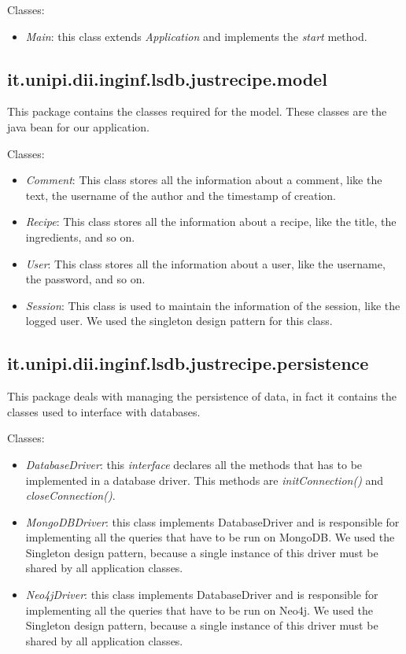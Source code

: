 \documentclass[a4paper]{report}
\begin{document}
\noindent Classes:
 \begin{itemize}
	\item \emph{Main}: this class extends \emph{Application} and implements the \emph{start} method. 
\end{itemize}
\subsection{it.unipi.dii.inginf.lsdb.justrecipe.model}
This package contains the classes required for the model. These classes are the java bean for our application.

\noindent Classes:
  \begin{itemize}
	\item \emph{Comment}: This class stores all the information about a comment, like the text, the username of the author and the timestamp of creation. 
	\item \emph{Recipe}: This class stores all the information about a recipe, like the title, the ingredients, and so on.
	\item \emph{User}: This class stores all the information about a user, like the username, the password, and so on.
	\item \emph{Session}: This class is used to maintain the information of the session, like the logged user. We used the singleton design pattern for this class.
\end{itemize}
\subsection {it.unipi.dii.inginf.lsdb.justrecipe.persistence}
This package deals with managing the persistence of data, in fact it contains the classes used to interface with databases.

\noindent Classes:
 \begin{itemize}
	\item \emph{DatabaseDriver}: this \emph{interface} declares all the methods that has to be implemented in a database driver. This methods are \emph{initConnection()} and \emph{closeConnection()}.  
	\item \emph{MongoDBDriver}: this class implements DatabaseDriver and is responsible for implementing all the queries that have to be run on MongoDB. We used the Singleton design pattern, because a single instance of this driver must be shared by all application classes. 
	\item \emph{Neo4jDriver}: this class implements DatabaseDriver and is responsible for implementing all the queries that have to be run on Neo4j. We used the Singleton design pattern, because a single instance of this driver must be shared by all application classes.
\end{itemize}
\end{document}
